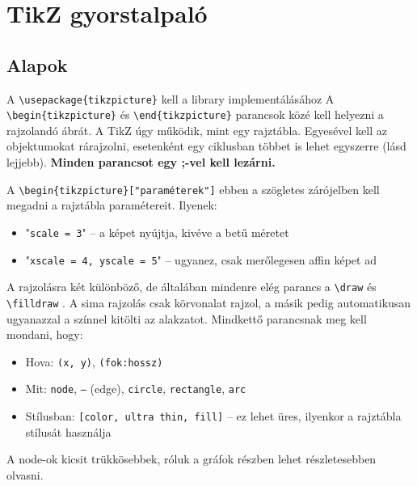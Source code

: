 \chapter{TikZ gyorstalpal\'o}

\section{Alapok}

A \verb|\usepackage{tikzpicture}| kell a library implementálásához A \verb|\begin{tikzpicture}| és \verb|\end{tikzpicture}| parancsok közé kell helyezni a rajzolandó ábrát. A TikZ úgy működik, mint egy rajztábla. Egyesével kell az objektumokat rárajzolni, esetenként egy ciklusban többet is lehet egyszerre (lásd lejjebb). \textbf{Minden parancsot egy  ;-vel kell lezárni.}

A \verb|\begin{tikzpicture}["paraméterek"]| ebben a szögletes zárójelben kell megadni a rajztábla paramétereit. Ilyenek:
\begin{itemize}
    \item "\texttt{scale = 3}"  -- a képet nyújtja, kivéve a betű méretet
    \item "\texttt{xscale = 4, yscale = 5}"  -- ugyanez, csak merőlegesen affin képet ad
\end{itemize}

A rajzolásra két különböző, de általában mindenre elég parancs a \verb|\draw| és \verb|\filldraw| . A sima rajzolás csak körvonalat rajzol, a másik pedig automatikusan ugyanazzal a színnel kitölti az alakzatot. Mindkettő parancsnak meg kell mondani, hogy:

\begin{itemize}
    \item Hova: \texttt{(x, y)}, \texttt{(fok:hossz)}
    \item Mit: \texttt{node}, \texttt{--} (edge), \texttt{circle}, \texttt{rectangle}, \texttt{arc}
    \item Stílusban: \texttt{[color, ultra thin, fill]} -- ez lehet üres, ilyenkor a rajztábla stílusát használja
\end{itemize}

A node-ok kicsit trükkösebbek, róluk a gráfok részben lehet részletesebben olvasni.

